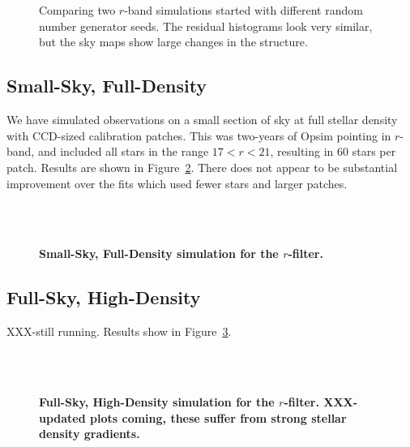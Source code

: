 \documentclass[12pt,preprint]{aastex}
\begin{document}
\begin{figure}
 \\
 \\
\caption{Comparing two $r$-band simulations started with different random number generator seeds.  The residual histograms look very similar, but the sky maps show large changes in the structure. \label{fig:diffseed} }
\end{figure}


\subsection{Small-Sky, Full-Density}
We have simulated observations on a small section of sky at full stellar density with CCD-sized calibration patches.  This was two-years of Opsim pointing in $r$-band, and included all stars in the range $17 < r < 21 $, resulting in 60 stars per patch.  Results are shown in Figure~\ref{fig:r1e6hd}.  There does not appear to be substantial improvement over the fits which used fewer stars and larger patches.

\begin{figure}
 \\
 \\
\caption{ {\bf Small-Sky, Full-Density simulation for the $r$-filter.}  \label{fig:r1e6hd}}
\end{figure}

\subsection{Full-Sky, High-Density}

XXX-still running.  Results show in Figure~\ref{fig:25mil}.

\begin{figure}
 \\
 \\
\caption{ {\bf Full-Sky, High-Density simulation for the $r$-filter.  XXX-updated plots coming, these suffer from strong stellar density gradients.}  \label{fig:25mil}}
\end{figure}
\end{document}
